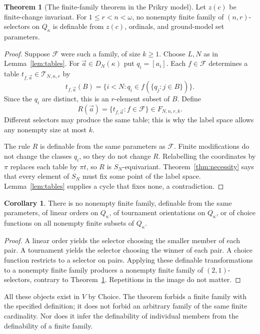 \documentclass[11pt,letterpaper]{article}
\theoremstyle{definition}
\newtheorem{theorem}[definition]{Theorem}
\newtheorem{corollary}[definition]{Corollary}
\numberwithin{equation}{section}
\begin{document}
\begin{theorem}[The finite-family theorem in the Prikry model]\label{thm:finitefamily}
Let $z(c)$ be finite-change invariant. For $1\le r<n<\omega$, no nonempty finite family of $(n,r)$-selectors on $Q_\kappa$ is definable from $z(c)$, ordinals, and ground-model set parameters.
\end{theorem}
\begin{proof}
Suppose $\mathcal F$ were such a family, of size $k\ge1$. Choose $L,N$ as in Lemma~\ref{lem:tables}. For $\vec a\in D_N(\kappa)$ put $q_i=[a_i]$. Each $f\in\mathcal F$ determines a table $t_{f,\vec a}\in\mathcal T_{N,n,r}$ by
\[
 t_{f,\vec a}(B)=\{i<N:q_i\in f(\{q_j:j\in B\})\}.
\]
Since the $q_i$ are distinct, this is an $r$-element subset of $B$. Define
\[
 R(\vec a)=\{t_{f,\vec a}:f\in\mathcal F\}\in F_{N,n,r,k}.
\]
Different selectors may produce the same table; this is why the label space allows any nonempty size at most $k$.

The rule $R$ is definable from the same parameters as $\mathcal F$. Finite modifications do not change the classes $q_i$, so they do not change $R$. Relabelling the coordinates by $\pi$ replaces each table by $\pi t$, so $R$ is $S_N$-equivariant. Theorem~\ref{thm:necessity} says that every element of $S_N$ must fix some point of the label space. Lemma~\ref{lem:tables} supplies a cycle that fixes none, a contradiction.
\end{proof}

\begin{corollary}\label{cor:orders}
There is no nonempty finite family, definable from the same parameters, of linear orders on $Q_\kappa$, of tournament orientations on $Q_\kappa$, or of choice functions on all nonempty finite subsets of $Q_\kappa$.
\end{corollary}
\begin{proof}
A linear order yields the selector choosing the smaller member of each pair. A tournament yields the selector choosing the winner of each pair. A choice function restricts to a selector on pairs. Applying these definable transformations to a nonempty finite family produces a nonempty finite family of $(2,1)$-selectors, contrary to Theorem~\ref{thm:finitefamily}. Repetitions in the image do not matter.
\end{proof}

All these objects exist in $V$ by Choice. The theorem forbids a finite family with the specified definition; it does not forbid an arbitrary family of the same finite cardinality. Nor does it infer the definability of individual members from the definability of a finite family.
\end{document}
